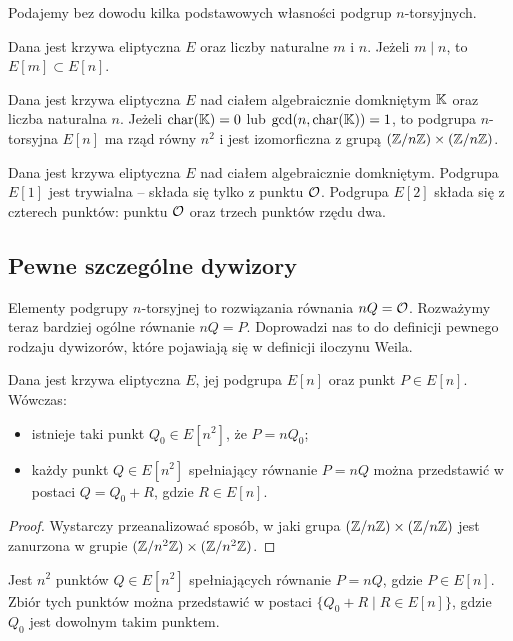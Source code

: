 Podajemy bez dowodu kilka podstawowych własności podgrup $n$-torsyjnych.

\begin{fact}
Dana jest krzywa eliptyczna $E$
oraz liczby naturalne $m$ i $n$.
Jeżeli $m \mid n$, to $E[m] \subset E[n]$.
\end{fact}

\begin{theorem}
Dana jest krzywa eliptyczna $E$ nad ciałem algebraicznie domkniętym $\mathbb{K}$
oraz liczba naturalna $n$.
Jeżeli $\operatorname{char}(\mathbb{K}) = 0$ lub $\gcd(n, \operatorname{char}(\mathbb{K})) = 1$,
to podgrupa $n$-torsyjna $E[n]$ ma rząd równy $n^2$
i jest izomorficzna z grupą $(\mathbb{Z} / n\mathbb{Z})\times(\mathbb{Z} / n\mathbb{Z})$.
\end{theorem}

\begin{corollary}
Dana jest krzywa eliptyczna $E$ nad ciałem algebraicznie domkniętym.
Podgrupa $E[1]$ jest trywialna -- składa się tylko z punktu $\mathcal{O}$.
Podgrupa $E[2]$ składa się z czterech punktów:
punktu $\mathcal{O}$ oraz trzech punktów rzędu dwa.
\end{corollary}

\subsection*{Pewne szczególne dywizory}

Elementy podgrupy $n$-torsyjnej to rozwiązania równania $nQ = \mathcal{O}$.
Rozważymy teraz bardziej ogólne równanie $nQ = P$.
Doprowadzi nas to do definicji pewnego rodzaju dywizorów,
które pojawiają się w definicji iloczynu Weila.

\begin{theorem}
Dana jest krzywa eliptyczna $E$, jej podgrupa $E[n]$ oraz punkt $P \in E[n]$.
Wówczas:
\begin{itemize}
\item istnieje taki punkt $Q_0 \in E[n^2]$, że $P = nQ_0$;
\item każdy punkt $Q \in E[n^2]$ spełniający równanie
$P = nQ$ można przedstawić w postaci $Q = Q_0 + R$,
gdzie $R \in E[n]$.
\end{itemize}
\end{theorem}

\begin{proof}
Wystarczy przeanalizować sposób, w jaki grupa $(\mathbb{Z}/n\mathbb{Z})\times(\mathbb{Z}/n\mathbb{Z})$
jest zanurzona w grupie $(\mathbb{Z}/n^2\mathbb{Z})\times(\mathbb{Z}/n^2\mathbb{Z})$.
\end{proof}

\begin{corollary}\label{point_division_corollary}
Jest $n^2$ punktów $Q \in E[n^2]$ spełniających równanie $P = nQ$,
gdzie $P \in E[n]$.
Zbiór tych punktów można przedstawić w postaci $\{Q_0 + R \mid R \in E[n]\}$,
gdzie $Q_0$ jest dowolnym takim punktem.
\end{corollary}

